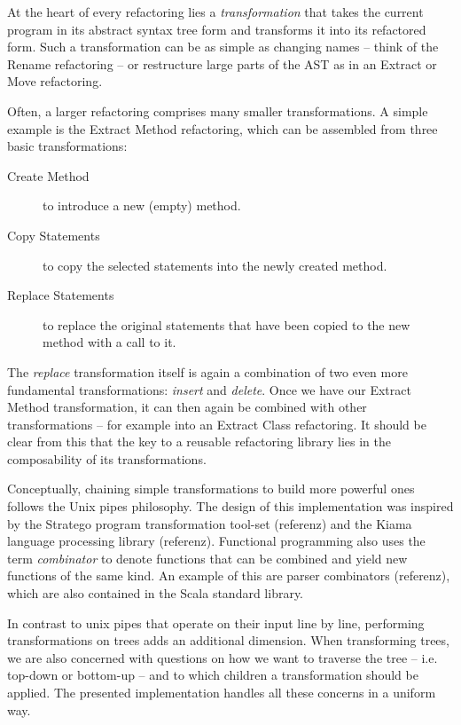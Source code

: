\documentclass[10pt,a4paper,oneside]{scrreprt}
\begin{document}
At the heart of every refactoring lies a \textit{transformation} that takes the current program in its abstract syntax tree form and transforms it into its refactored form. Such a transformation can be as simple as changing names -- think of the Rename refactoring -- or restructure large parts of the AST as in an Extract or Move refactoring. 

Often, a larger refactoring comprises many smaller transformations. A simple example is the Extract Method refactoring, which can be assembled from three basic transformations:

\begin{description}
 \item[Create Method] to introduce a new (empty) method.
 \item[Copy Statements] to copy the selected statements into the newly created method.
 \item[Replace Statements] to replace the original statements that have been copied to the new method with a call to it.
\end{description}

The \textit{replace} transformation itself is again a combination of two even more fundamental transformations: \textit{insert} and \textit{delete}. Once we have our Extract Method transformation, it can then again be combined with other transformations -- for example into an Extract Class refactoring. It should be clear from this that the key to a reusable refactoring library lies in the composability of its transformations. 

Conceptually, chaining simple transformations to build more powerful ones follows the Unix pipes philosophy. The design of this implementation was inspired by the Stratego program transformation tool-set (referenz) and the Kiama language processing library (referenz). Functional programming also uses the term \textit{combinator} to denote functions that can be combined and yield new functions of the same kind. An example of this are parser combinators (referenz), which are also contained in the Scala standard library.

In contrast to unix pipes that operate on their input line by line, performing transformations on trees adds an additional dimension. When transforming trees, we are also concerned with questions on how we want to traverse the tree -- i.e. top-down or bottom-up -- and to which children a transformation should be applied. The presented implementation handles all these concerns in a uniform way.
\end{document}
